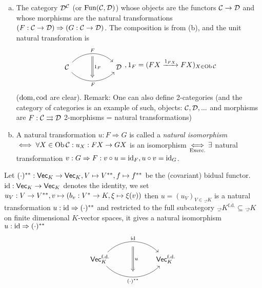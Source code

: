 \documentclass[a4paper]{report}
\begin{document}
\begin{defi}
\begin{enumerate}[(a)]
    \item The category $\mathcal{D}^{\mathcal{C}}$ (or $\mathrm{Fun}(\mathcal{C}, \mathcal{D})$) whose objects are the functors $\mathcal{C} \to \mathcal{D}$ and whose morphisms are the natural transformations $(F: \mathcal{C} \to \mathcal{D}) \Rightarrow (G: \mathcal{C} \to \mathcal{D})$. The composition is from (b), and the unit natural transforation is \[\begin{tikzcd}[row sep = 8]
& {} \arrow[dd, "1_{F}", Rightarrow] &    \\
\C \arrow[rr, "F", bend left=45] \arrow[rr, "F"', bend right=45] &                                & \D \\
& {}                             &
\end{tikzcd}, 1_{F} = (FX \xrightarrow{1_{FX}} FX)_{X \in \Ob \C}\]($\operatorname{dom}, \operatorname{cod}$ are clear).
  Remark: One can also define 2-categories (and the category of categories is an example of such, objects: $\mathcal{C}, \mathcal{D}, ...$ and morphisms are $F: \mathcal{C} \rightrightarrows \mathcal{D}$ 2-morphisms = natural transformations)
  \item A natural transformation $u: F \Rightarrow G$ is called a \emph{natural isomorphism} $\iff \forall X \in \operatorname{Ob} \mathcal{C} : u_{X}: FX \to GX$ is an isomorphism $\underset{\text{Exerc.}} \iff \exists$ natural transformation $v: G \Rightarrow F : v \circ u = \operatorname{id}_{F}, u \circ v = \operatorname{id}_{G}$.
  \end{enumerate}
\end{defi}


\begin{exmp*}
  Let $(\cdot)^{**}: \mathsf{Vec}_{K} \to \mathsf{Vec}_{K}, V \mapsto V^{**}, f \mapsto f^{**}$ be the (covariant) bidual functor. $\operatorname{id}: \mathsf{Vec}_{K} \to \mathsf{Vec}_{K}$ denotes the identity, we set $u_{V}: V \to V^{**}, v \mapsto (b_{v}: V^{*} \to K, \xi \mapsto \xi(v))$ then $u = (u_{V})_{V \in \Vec_{K}}$ is a natural transformation $u: \operatorname{id} \Rightarrow (\cdot)^{**}$ and restricted to the full subcategory $\Vec_{K}^{\text{f.d.}} \subseteq \Vec_{K}$ on finite dimensional $K$-vector spaces, it gives a natural isomorphism $u: \operatorname{id} \Rightarrow (\cdot)^{**}$
  \[\begin{tikzcd}[row sep = 8]
& {} \arrow[dd, "u", Rightarrow] &    \\
\Vec_{K}^{\text{f.d.}} \arrow[rr, "\id", bend left=45] \arrow[rr, "(\cd)^{**}"', bend right=45] &                                &\Vec_{K}^{\text{f.d.}}\\
& {}                             &
\end{tikzcd}\]
\end{exmp*}
\end{document}
